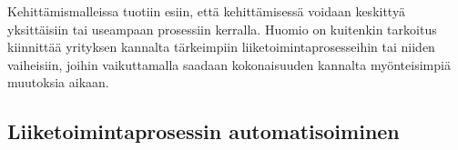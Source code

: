 \documentclass[finnish,12pt,a4paper,pdftex]{article}
\begin{document}
Kehittämismalleissa tuotiin esiin, että kehittämisessä voidaan keskittyä yksittäisiin tai useampaan prosessiin kerralla. Huomio on kuitenkin tarkoitus kiinnittää yrityksen kannalta tärkeimpiin liiketoimintaprosesseihin tai niiden vaiheisiin, joihin vaikuttamalla saadaan kokonaisuuden kannalta myönteisimpiä muutoksia aikaan.\\







\subsection{Liiketoimintaprosessin automatisoiminen}
\end{document}
